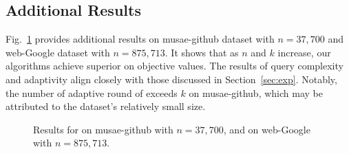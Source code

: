 \subsection{Additional Results}\label{apx:nmon}
Fig.~\ref{fig:apx} provides additional results on musae-github dataset with $n=37,700$
and web-Google dataset with $n=875,713$.
It shows that as $n$ and $k$ increase, our algorithms achieve superior on objective values.
The results of query complexity and adaptivity align closely with those discussed in Section~\ref{sec:exp}.
Notably, the number of adaptive round of \ptgtwoshort exceeds $k$ on musae-github,
which may be attributed to the dataset's relatively small size.
\begin{figure}[ht]
    \centering
    \caption{Results for \revmax on musae-github with $n=37,700$,
    and \maxcut on web-Google with $n=875,713$.}
    \label{fig:apx}
\end{figure}

















